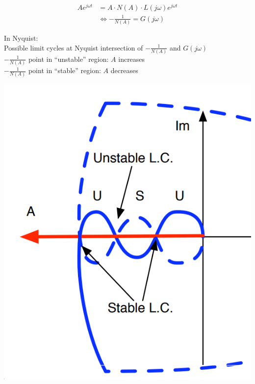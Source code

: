     \begin{minipage}{0.54\linewidth}
        \begin{align*}
            A e^{j \omega t} &= A \cdot N(A) \cdot L(j \omega) e^{j \omega t}\\
            &\Leftrightarrow - \frac{1}{N(A)} = G(j \omega)
        \end{align*}

        
        In Nyquist:\\
        Possible limit cycles at Nyquist intersection of $- \frac{1}{N(A)}$ and $G(j \omega)$\\
        
        
        $-\frac{1}{N(A)}$ point in “unstable” region: $A$ increases\\
        
        
        $-\frac{1}{N(A)}$ point in “stable” region: $A$ decreases
    \end{minipage}
    \begin{minipage}{0.44\linewidth}
        \includegraphics[width = \linewidth]{src/images/nonlinearity_stability_limit_cycles.png}
    \end{minipage}
    
